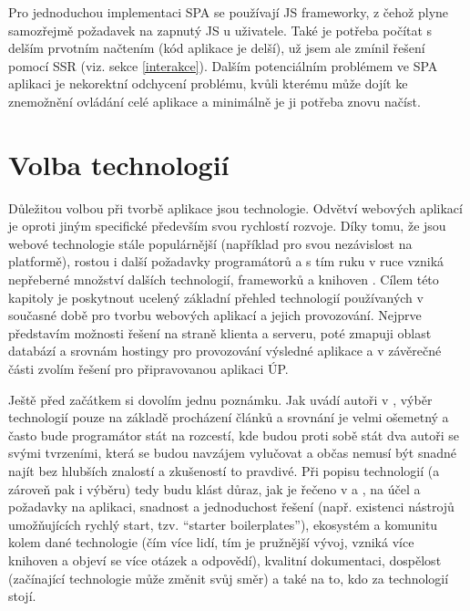         Pro jednoduchou implementaci SPA se používají JS frameworky, z čehož plyne samozřejmě požadavek na zapnutý JS u uživatele. Také je potřeba počítat s delším prvotním načtením (kód aplikace je delší), už jsem ale zmínil řešení pomocí SSR (viz. sekce \ref{interakce}). Dalším potenciálním problémem ve SPA aplikaci je nekorektní odchycení problému, kvůli kterému může dojít ke znemožnění ovládání celé aplikace a minimálně je ji potřeba znovu načíst.

\chapter{Volba technologií}\label{technologie}
Důležitou volbou při tvorbě aplikace jsou technologie. Odvětví webových aplikací je oproti jiným specifické především svou rychlostí rozvoje. Díky tomu, že jsou webové technologie stále populárnější (například pro svou nezávislost na platformě), rostou i další požadavky programátorů a s tím ruku v ruce vzniká nepřeberné množství dalších technologií, frameworků a knihoven \cite{moderni-webapps}\cite{moderni-webapps2}. Cílem této kapitoly je poskytnout ucelený základní přehled technologií používaných v současné době pro tvorbu webových aplikací a jejich provozování. Nejprve představím možnosti řešení na straně klienta a serveru, poté zmapuji oblast databází a srovnám hostingy pro provozování výsledné aplikace a v závěrečné části zvolím řešení pro připravovanou aplikaci ÚP.

Ještě před začátkem si dovolím jednu poznámku. Jak uvádí autoři v \cite{technologie1}, výběr technologií pouze na základě procházení článků a srovnání je velmi ošemetný a často bude programátor stát na rozcestí, kde budou proti sobě stát dva autoři se svými tvrzeními, která se budou navzájem vylučovat a občas nemusí být snadné najít bez hlubších znalostí a zkušeností to pravdivé. Při popisu technologií (a zároveň pak i výběru) tedy budu klást důraz, jak je řečeno v \cite{technologie1} a \cite{technologie2}, na účel a požadavky na aplikaci, snadnost a jednoduchost řešení (např. existenci nástrojů umožňujících rychlý start, tzv. \enquote{starter boilerplates}), ekosystém a komunitu kolem dané technologie (čím více lidí, tím je pružnější vývoj, vzniká více knihoven a objeví se více otázek a odpovědí), kvalitní dokumentaci, dospělost (začínající technologie může změnit svůj směr) a také na to, kdo za technologií stojí.

